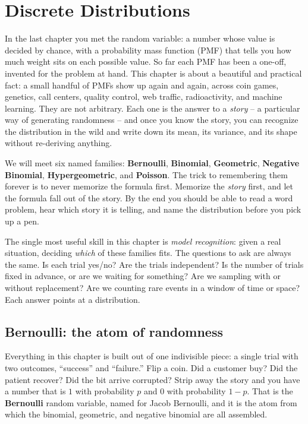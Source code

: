 \chapter{Discrete Distributions}

In the last chapter you met the random variable: a number whose value is decided
by chance, with a probability mass function (PMF) that tells you how much weight
sits on each possible value. So far each PMF has been a one-off, invented for the
problem at hand. This chapter is about a beautiful and practical fact: a small
handful of PMFs show up again and again, across coin games, genetics, call
centers, quality control, web traffic, radioactivity, and machine learning. They
are not arbitrary. Each one is the answer to a \emph{story} -- a particular way of
generating randomness -- and once you know the story, you can recognize the
distribution in the wild and write down its mean, its variance, and its shape
without re-deriving anything.

We will meet six named families: \textbf{Bernoulli}, \textbf{Binomial},
\textbf{Geometric}, \textbf{Negative Binomial}, \textbf{Hypergeometric}, and
\textbf{Poisson}. The trick to remembering them forever is to never memorize the
formula first. Memorize the \emph{story} first, and let the formula fall out of
the story. By the end you should be able to read a word problem, hear which story
it is telling, and name the distribution before you pick up a pen.

\begin{focusbox}
The single most useful skill in this chapter is \emph{model recognition}: given a
real situation, deciding \emph{which} of these families fits. The questions to ask
are always the same. Is each trial yes/no? Are the trials independent? Is the
number of trials fixed in advance, or are we waiting for something? Are we
sampling with or without replacement? Are we counting rare events in a window of
time or space? Each answer points at a distribution.
\end{focusbox}

\section{Bernoulli: the atom of randomness}
\label{ch07:bernoulli}

Everything in this chapter is built out of one indivisible piece: a single trial
with two outcomes, ``success'' and ``failure.'' Flip a coin. Did a customer buy?
Did the patient recover? Did the bit arrive corrupted? Strip away the story and
you have a number that is $1$ with probability $p$ and $0$ with probability
$1-p$. That is the \textbf{Bernoulli} random variable, named for Jacob Bernoulli,
and it is the atom from which the binomial, geometric, and negative binomial are
all assembled.

